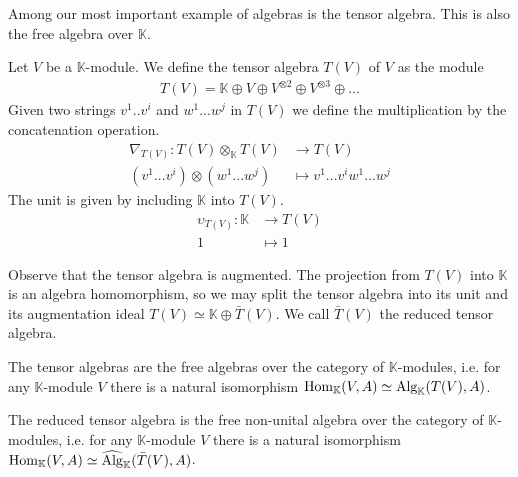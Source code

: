 \documentclass[../thesis.tex]{subfiles}
\begin{document}
            Among our most important example of algebras is the tensor algebra. This is also the free algebra over $\mathbb{K}$.

            \begin{example}
                Let $V$ be a $\mathbb{K}$-module. We define the tensor algebra $T(V)$ of $V$ as the module
                \begin{align*}
                    T(V) = \mathbb{K}\oplus V\oplus V^{\otimes 2} \oplus V^{\otimes 3} \oplus ...
                \end{align*}
                Given two strings $v^1..v^i$ and $w^1...w^j$ in $T(V)$ we define the multiplication by the concatenation operation.
                \begin{align*}
                    \nabla_{T(V)} : T(V)\otimes_{\mathbb{K}} T(V) & \rightarrow T(V) \\
                    (v^1...v^i)\otimes(w^1...w^j) & \mapsto v^1...v^iw^1...w^j
                \end{align*}
                The unit is given by including $\mathbb{K}$ into $T(V)$.
                \begin{align*}
                    \upsilon_{T(V)} : \mathbb{K} & \rightarrow T(V) \\
                    1 & \mapsto 1
                \end{align*}
            \end{example}

            Observe that the tensor algebra is augmented. The projection from $T(V)$ into $\mathbb{K}$ is an algebra homomorphism, so we may split the tensor algebra into its unit and its augmentation ideal $T(V) \simeq \mathbb{K}\oplus\bar{T}(V)$. We call $\bar{T}(V)$ the reduced tensor algebra.

            \begin{proposition}
                The tensor algebras are the free algebras over the category of $\mathbb{K}$-modules, i.e. for any $\mathbb{K}$-module $V$ there is a natural isomorphism $\tt{Hom}_{\mathbb{K}}(V,A)\simeq \tt{Alg}_{\mathbb{K}}(T(V),A)$.

                The reduced tensor algebra is the free non-unital algebra over the category of $\mathbb{K}$-modules, i.e. for any $\mathbb{K}$-module $V$ there is a natural isomorphism $\tt{Hom}_{\mathbb{K}}(V,A)\simeq \widehat{\tt{Alg}}_{\mathbb{K}}(\bar{T}(V),A)$.
            \end{proposition}
\end{document}

